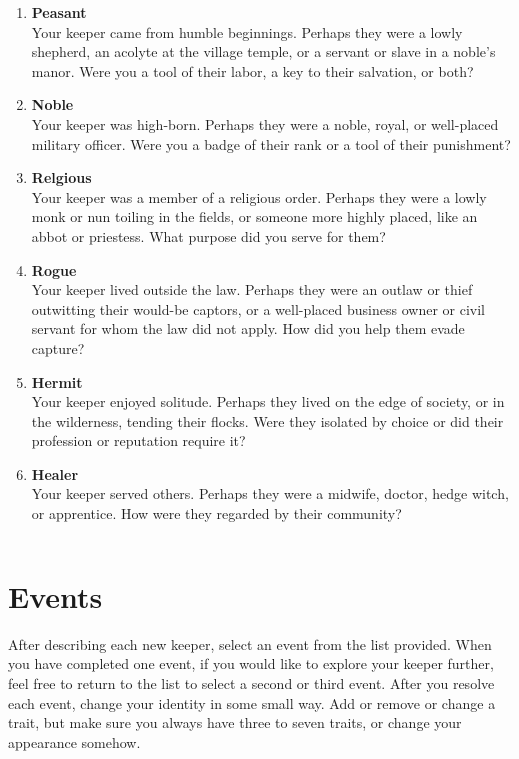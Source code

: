 \documentclass[
  a5paper,
]{article}
\begin{document}
\begin{enumerate}
\def\labelenumi{\arabic{enumi}.}
\item
  \textbf{Peasant}\\
  Your keeper came from humble beginnings. Perhaps they were a lowly shepherd, an acolyte at the village temple, or a servant or slave in a noble's manor. Were you a tool of their labor, a key to their salvation, or both?
\item
  \textbf{Noble}\\
  Your keeper was high-born. Perhaps they were a noble, royal, or well-placed military officer. Were you a badge of their rank or a tool of their punishment?
\item
  \textbf{Relgious}\\
  Your keeper was a member of a religious order. Perhaps they were a lowly monk or nun toiling in the fields, or someone more highly placed, like an abbot or priestess. What purpose did you serve for them?
\item
  \textbf{Rogue}\\
  Your keeper lived outside the law. Perhaps they were an outlaw or thief outwitting their would-be captors, or a well-placed business owner or civil servant for whom the law did not apply. How did you help them evade capture?
\item
  \textbf{Hermit}\\
  Your keeper enjoyed solitude. Perhaps they lived on the edge of society, or in the wilderness, tending their flocks. Were they isolated by choice or did their profession or reputation require it?
\item
  \textbf{Healer}\\
  Your keeper served others. Perhaps they were a midwife, doctor, hedge witch, or apprentice. How were they regarded by their community?
\end{enumerate}

\pagebreak

\(~\)

\hypertarget{events}{%
\section{Events}\label{events}}

After describing each new keeper, select an event from the list provided. When you have completed one event, if you would like to explore your keeper further, feel free to return to the list to select a second or third event. After you resolve each event, change your identity in some small way. Add or remove or change a trait, but make sure you always have three to seven traits, or change your appearance somehow.
\end{document}
